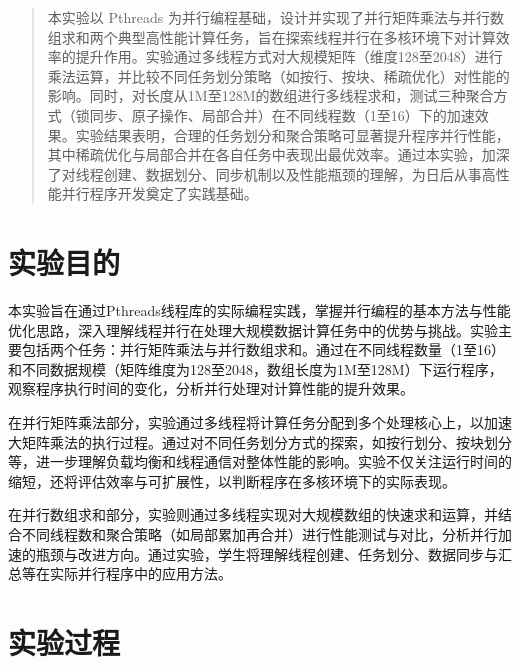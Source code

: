 \documentclass[a4paper, utf8]{ctexart}
\begin{document}
	\maketitle
	
	\renewcommand{\abstractname}{\large \textbf{摘要}}
	\begin{abstract}
		本实验以 Pthreads 为并行编程基础，设计并实现了并行矩阵乘法与并行数组求和两个典型高性能计算任务，旨在探索线程并行在多核环境下对计算效率的提升作用。实验通过多线程方式对大规模矩阵（维度128至2048）进行乘法运算，并比较不同任务划分策略（如按行、按块、稀疏优化）对性能的影响。同时，对长度从1M至128M的数组进行多线程求和，测试三种聚合方式（锁同步、原子操作、局部合并）在不同线程数（1至16）下的加速效果。实验结果表明，合理的任务划分和聚合策略可显著提升程序并行性能，其中稀疏优化与局部合并在各自任务中表现出最优效率。通过本实验，加深了对线程创建、数据划分、同步机制以及性能瓶颈的理解，为日后从事高性能并行程序开发奠定了实践基础。
		
	\end{abstract}
	
	\section{实验目的}
	
	本实验旨在通过Pthreads线程库的实际编程实践，掌握并行编程的基本方法与性能优化思路，深入理解线程并行在处理大规模数据计算任务中的优势与挑战。实验主要包括两个任务：并行矩阵乘法与并行数组求和。通过在不同线程数量（1至16）和不同数据规模（矩阵维度为128至2048，数组长度为1M至128M）下运行程序，观察程序执行时间的变化，分析并行处理对计算性能的提升效果。
	
	在并行矩阵乘法部分，实验通过多线程将计算任务分配到多个处理核心上，以加速大矩阵乘法的执行过程。通过对不同任务划分方式的探索，如按行划分、按块划分等，进一步理解负载均衡和线程通信对整体性能的影响。实验不仅关注运行时间的缩短，还将评估效率与可扩展性，以判断程序在多核环境下的实际表现。
	
	在并行数组求和部分，实验则通过多线程实现对大规模数组的快速求和运算，并结合不同线程数和聚合策略（如局部累加再合并）进行性能测试与对比，分析并行加速的瓶颈与改进方向。通过实验，学生将理解线程创建、任务划分、数据同步与汇总等在实际并行程序中的应用方法。
	
	\section{实验过程}
	
\end{document}
